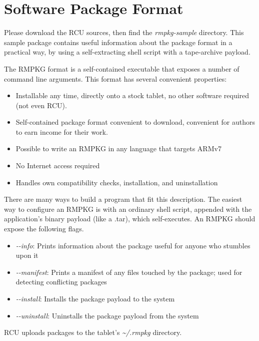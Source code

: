 \chapter{Software Package Format}
\label{sec:softwarepackageformat}
Please download the RCU sources, then find the \textit{rmpkg-sample} directory. This sample package contains useful information about the package format in a practical way, by using a self-extracting shell script with a tape-archive payload.

The RMPKG format is a self-contained executable that exposes a number of command line arguments. This format has several convenient properties:

\begin{itemize}
\item{Installable any time, directly onto a stock tablet, no other software required (not even RCU).}
\item{Self-contained package format convenient to download, convenient for authors to earn income for their work.}
\item{Possible to write an RMPKG in any language that targets ARMv7}
  \item{No Internet access required}
\item{Handles own compatibility checks, installation, and uninstallation}
  \end{itemize}


There are many ways to build a program that fit this description. The easiest way to configure an RMPKG is with an ordinary shell script, appended with the application's binary payload (like a .tar), which self-executes. An RMPKG should expose the following flags.

\begin{itemize}
\item{\textit{\phantom{}-\phantom{}-info}: Prints information about the package useful for anyone who stumbles upon it}
\item{\textit{\phantom{}-\phantom{}-manifest}: Prints a manifest of any files touched by the package; used for detecting conflicting packages}
\item{\textit{\phantom{}-\phantom{}-install}: Installs the package payload to the system}
\item{\textit{\phantom{}-\phantom{}-uninstall}: Uninstalls the package payload from the system}
\end{itemize}

RCU uploads packages to the tablet's \textit{\textasciitilde /.rmpkg} directory. %
